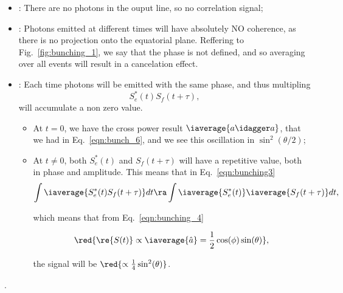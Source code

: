   \begin{itemize}
  \item  {}: There  are no  photons in  the ouput  line, so  no correlation
    signal;
  \item  {}: Photons  emitted at  different times  will have  absolutely NO
    coherence, as there is no projection  onto the equatorial plane. Reffering to
    Fig.~\ref{fig:bunching_1},  we say  that the  phase  is not  defined, and  so
    averaging over all events will result in a cancelation effect.
  \item  \isuperposition{+}: Each  time photons  will  be emitted  with the  same
    phase, and thus multipling
    \begin{equation}\label{bunching9}
      S_{e}^{*}(t)S_{f}(t+\tau),
    \end{equation}
    \noindent will accumulate a non zero value.
    \begin{itemize}
    \item   At    $   t   =   0    $,   we   have   the    cross   power   result
      $ \iaverage{a\idagger a} $, that  we had in Eq.~\eqref{eqn:bunch_6}, and we
      see this oscillation in $ \sin^2(\theta/2) $;
    \item  At $  t \neq  0$, both  $ S_e^{*}(t)  $ and  $ S_{f}(t+\tau)  $ will  have a
      repetitive  value,  both  in  phase  and amplitude.   This  means  that  in
      Eq.~\eqref{eqn:bunching3}
      \begin{equation}\label{}
        \int\iaverage{S_{e}^{*}(t)S_{f}(t+\tau)}dt \ra \int \iaverage{S_e^{*}(t)}\iaverage{S_{f}(t+\tau)}dt,
      \end{equation}
  	
      \noindent which means that from Eq.~\eqref{eqn:bunching_4}
  	
  	\begin{equation}\label{bunching10}
          \red{\re{S(t)} \propto \iaverage{\hat{a}} = \frac{1}{2}\cos(\phi)\sin(\theta)},
  	\end{equation}
  	
  	\noindent the signal will be $ \red{\propto \frac{1}{4}\sin^2(\theta)} $.
  	
      \end{itemize}
    \end{itemize}

     .
	
